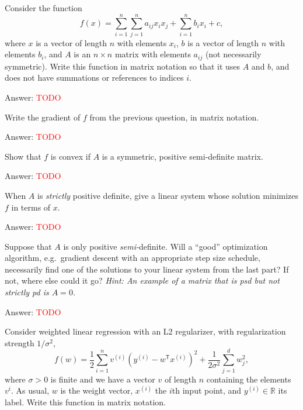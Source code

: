 \documentclass{article}
\newcommand{\ask}[1]{\textcolor{question}{#1}}
\newenvironment{answer}{\par\begingroup\color{answer}Answer: }{\endgroup}
\newcommand{\red}[1]{\textcolor{red}{#1}}
\newcommand{\hint}[1]{\textcolor{black!60!white}{\emph{Hint: #1}}}
\newcommand{\TODO}{\red{TODO}}
\newcommand{\R}{\mathbb{R}}
\newcommand{\tp}{^\mathsf{T}}
\begin{document}
\begin{qlist}
\item Consider the function
\[
f(x) = \sum_{i=1}^n\sum_{j=1}^n a_{ij}x_ix_j + \sum_{i=1}^n b_ix_i + c,
\]
where $x$ is a vector of length $n$ with elements $x_i$, $b$ is a vector of length $n$ with elements $b_i$, and $A$ is an $n \times n$ matrix with elements $a_{ij}$ (not necessarily symmetric). \ask{Write this function in matrix notation} so that it uses $A$ and $b$, and does not have summations or references to indices $i$.

\begin{answer}\TODO\end{answer}

\item \ask{Write the gradient of $f$ from the previous question, in matrix notation}.
\begin{answer}\TODO\end{answer}

\item \label{q:mat:quad-conv} \ask{Show that $f$ is convex} if $A$ is a symmetric, positive semi-definite matrix.

\begin{answer}\TODO\end{answer}

\item When $A$ is \emph{strictly} positive definite, \ask{give a linear system whose solution minimizes $f$ in terms of $x$}.

\begin{answer}\TODO\end{answer}

\item Suppose that $A$ is only positive \emph{semi-}definite. \ask{Will a ``good'' optimization algorithm}, e.g.\ gradient descent with an appropriate step size schedule, \ask{necessarily find one of the solutions to your linear system from the last part? If not, where else could it go?}
\hint{An example of a matrix that is psd but not strictly pd is $A = 0$.}

\begin{answer}\TODO\end{answer}

\item Consider weighted linear regression with an L2 regularizer, with regularization strength $1/\sigma^2$,
\[
f(w) = \frac12 \sum_{i=1}^n v^{(i)} (y^{(i)}  - w\tp x^{(i)} )^2 + \frac{1}{2\sigma^2}\sum_{j=1}^d w_j^2,
\]
where $\sigma > 0$ is finite and we have a vector $v$ of length $n$ containing the elements $v^i$.
As usual, $w$ is the weight vector, $x^{(i)}$ the $i$th input point, and $y^{(i)} \in \R$ its label.
\ask{Write this function in matrix notation}.


\end{qlist}
\end{document}
